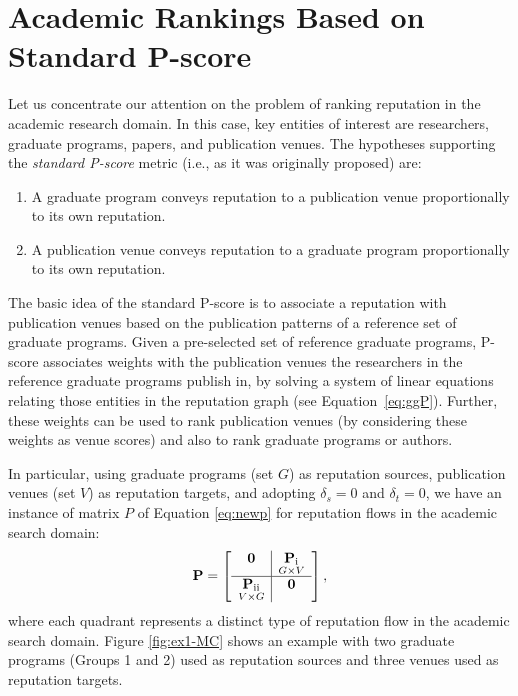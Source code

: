 \documentclass[msc]{ppgccufmg}
\begin{document}
\section{Academic Rankings Based on Standard P-score}\label{sec:spscore}

Let us concentrate our attention on the problem of ranking reputation in the academic research domain. In this case, key entities of interest are researchers, graduate programs, papers, and publication venues. The hypotheses supporting the \textit{standard P-score} metric (i.e., as it was originally proposed) are:

\begin{enumerate}
    \item A graduate program conveys reputation to a publication venue proportionally to its own reputation.
    \item A publication venue conveys reputation to a graduate program proportionally to its own reputation.
\end{enumerate}

The basic idea of the standard P-score is to associate a reputation with publication venues based on the publication patterns of a reference set of graduate programs. Given a pre-selected set of reference graduate programs, P-score associates weights with the publication venues the researchers in the reference graduate programs publish in, by solving a system of linear equations relating those entities in the reputation graph (see Equation~\ref{eq:ggP}). Further, these weights can be used to rank publication venues (by considering these weights as venue scores) and also to rank graduate programs or authors.

In particular, using graduate programs (set $G$) as reputation sources, publication venues (set $V$) as reputation targets, and adopting $\delta_{s} = 0$ and $\delta_{t} = 0$, we have an instance of matrix $P$ of Equation \ref{eq:newp} for reputation flows in the academic search domain:
\begin{align}\label{eq:newp2}
{\bf P} =
\left[
\begin{array}{c | c}
    \textbf{0}  & \underset{G \times V}{{\bf P}_{\text{i}}} \\
    \hline
    \underset{V \times G}{{\bf P}_{\text{ii}}}  & \textbf{0} \\
\end{array}
\right],
\end{align}
where each quadrant represents a distinct type of reputation flow in the academic search domain. 
%
Figure \ref{fig:ex1-MC} shows an example with two graduate programs (Groups 1 and 2) used as reputation sources and three venues used as reputation targets.
\end{document}
